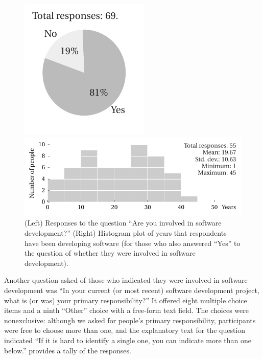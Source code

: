 \documentclass{casicswhitepaper}
\begin{document}

\begin{figure}[thb]
  \vspace*{2.5ex}
  \hspace*{0.1in}
  \begin{minipage}[b]{0.265\linewidth}
    \includegraphics{files/plots/number-of-developers.pdf}
  \end{minipage}%
  \begin{minipage}[b]{0.75\linewidth}
    \includegraphics{files/plots/histogram-years.pdf}
  \end{minipage}%
  \vspace*{-1ex}
  \caption{(Left) Responses to the question  ``Are you involved in software development?'' (Right) Histogram plot of years that respondents have been developing software (for those who also answered ``Yes'' to the question of whether they were involved in software development).}
  \label{years}
\end{figure}

Another question asked of those who indicated they were involved in software development was ``In your current (or most recent) software development project, what is (or was) your primary responsibility?'' It offered eight multiple choice items and a ninth ``Other'' choice with a free-form text field.  The choices were nonexclusive: although we asked for people's primary responsibility, participants were free to choose more than one, and the explanatory text for the question indicated ``If it is hard to identify a single one, you can indicate more than one below.''   provides a tally of the responses.
\end{document}
